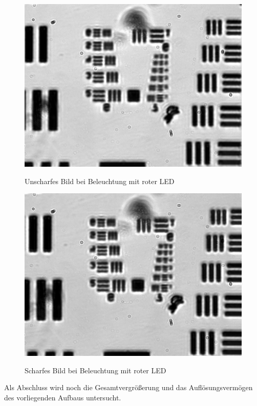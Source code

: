 \documentclass[ngerman]{scrartcl}
\begin{document}
\begin{figure}[H]
    \begin{minipage}[t]{0.475\linewidth}
        \centering
        \includegraphics[width=\linewidth]{fig/Versuch3/hellfeld_3.3_rot_unscharf.jpg}
        \caption[Hellfeld LED rot unscharf]{Unscharfes Bild bei Beleuchtung mit roter LED}
        \label{fig:Hellfeld_3_3_rot_unscharf}
        \includegraphics[width=\linewidth]{fig/Versuch3/hellfeld_3.3_rot_scharf.jpg}
        \caption[Hellfeld LED rot scharf]{Scharfes Bild bei Beleuchtung mit roter LED}
        \label{fig:Hellfeld_3_3_rot_scharf}
    \end{minipage}
\end{figure}
\setcaphanging

Als Abschluss wird noch die Gesamtvergrößerung und das Auflösungsvermögen des vorliegenden Aufbaus untersucht.
\end{document}
